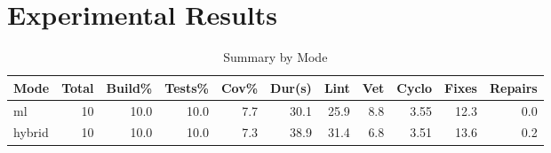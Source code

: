 \documentclass{article}
\begin{document}
\section*{Experimental Results}

\begin{table}[h]
\centering
\caption{Summary by Mode}
\begin{tabular}{lrrrrrrrrrr}
\toprule
Mode & Total & Build\% & Tests\% & Cov\% & Dur(s) & Lint & Vet & Cyclo & Fixes & Repairs \\
\midrule
ml & 10 & 10.0 & 10.0 & 7.7 & 30.1 & 25.9 & 8.8 & 3.55 & 12.3 & 0.0 \\
hybrid & 10 & 10.0 & 10.0 & 7.3 & 38.9 & 31.4 & 6.8 & 3.51 & 13.6 & 0.2 \\
\bottomrule
\end{tabular}
\end{table}
\end{document}
